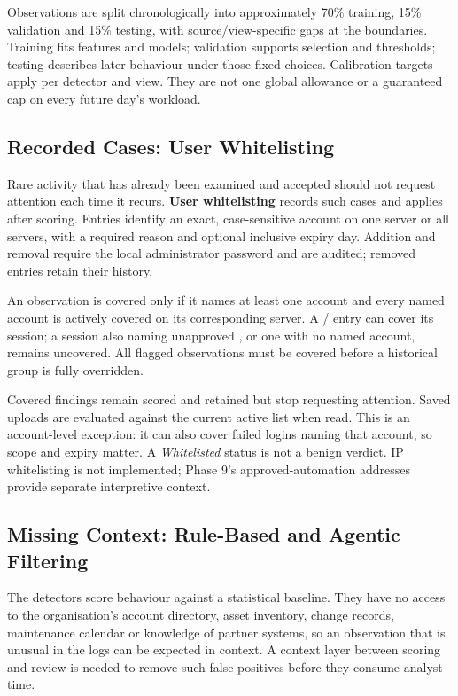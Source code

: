 \documentclass[11pt,a4paper]{article}
\newcommand{\tok}[1]{\texttt{\detokenize{#1}}}
\begin{document}
Observations are split chronologically into approximately 70\% training, 15\% validation and 15\% testing, with source/view-specific gaps at the boundaries. Training fits features and models; validation supports selection and thresholds; testing describes later behaviour under those fixed choices. Calibration targets apply per detector and view. They are not one global allowance or a guaranteed cap on every future day's workload.

\subsection{Recorded Cases: User Whitelisting}\label{sec:core-whitelist}

Rare activity that has already been examined and accepted should not request attention each time it recurs. \textbf{User whitelisting} records such cases and applies after scoring. Entries identify an exact, case-sensitive account on one server or all servers, with a required reason and optional inclusive expiry day. Addition and removal require the local administrator password and are audited; removed entries retain their history.

An observation is covered only if it names at least one account and every named account is actively covered on its corresponding server. A \tok{backup}/\tok{host-a} entry can cover its session; a session also naming unapproved \tok{root}, or one with no named account, remains uncovered. All flagged observations must be covered before a historical group is fully overridden.

Covered findings remain scored and retained but stop requesting attention. Saved uploads are evaluated against the current active list when read. This is an account-level exception: it can also cover failed logins naming that account, so scope and expiry matter. A \emph{Whitelisted} status is not a benign verdict. IP whitelisting is not implemented; Phase 9's approved-automation addresses provide separate interpretive context.

\subsection{Missing Context: Rule-Based and Agentic Filtering}\label{sec:core-context}

The detectors score behaviour against a statistical baseline. They have no access to the organisation's account directory, asset inventory, change records, maintenance calendar or knowledge of partner systems, so an observation that is unusual in the logs can be expected in context. A context layer between scoring and review is needed to remove such false positives before they consume analyst time.
\end{document}
